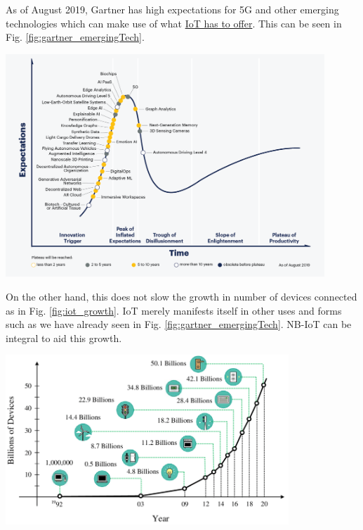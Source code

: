 \documentclass[]{article}
\let\origfigure\figure
\let\endorigfigure\endfigure
\renewenvironment{figure}[1][2] {
    \expandafter\origfigure\expandafter[H]
} {
    \endorigfigure
}
\begin{document}
As of August 2019, Gartner has high expectations for 5G and other
emerging technologies which can make use of what
\href{https://blogs.sas.com/content/hiddeninsights/2016/07/06/long-live-the-iot-hype/}{IoT
has to offer}. This can be seen in Fig. \ref{fig:gartner_emergingTech}.

\begin{figure}
\centering
\includegraphics[width=0.9\textwidth,height=\textheight]{../images/CTMKT_741609_CTMKT_for_Emerging_Tech_Hype_Cycle_LargerText-1.png}
\caption{Gartner's Hype Cycle for Emerging Technologies, 2019. IoT is
inextricably linked to at least a third of emerging technologies and
also has uses in NB-IoT. \label{fig:gartner_emergingTech}}
\end{figure}

On the other hand, this does not slow the growth in number of devices
connected as in Fig. \ref{fig:iot_growth}. IoT merely manifests itself
in other uses and forms such as we have already seen in Fig.
\ref{fig:gartner_emergingTech}. NB-IoT can be integral to aid this
growth.

\begin{figure}
\centering
\includegraphics[width=0.8\textwidth,height=\textheight]{../images/Expected-number-of-connected-devices-to-the-Internet-This-chart-is-obtained-from-recent.png}
\caption{Exponential growth of IoT is estimated
{[}\protect\hyperlink{ref-Ali2015}{4}{]}. \label{fig:iot_growth}}
\end{figure}
\end{document}
